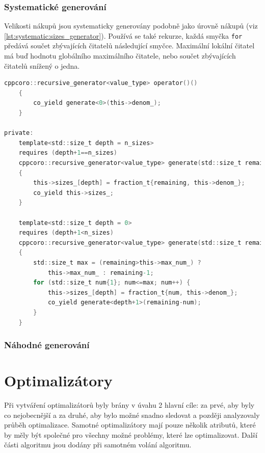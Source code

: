 \subsection{Systematické generování}
Velikosti nákupů jsou systematicky generovány podobně jako úrovně nákupů (viz \ref{lst:systematic:sizes_generator}).
Používá se také rekurze, každá smyčka \texttt{for} předává součet zbývajících čitatelů následující smyčce.
Maximální lokální čitatel má buď hodnotu globálního maximálního čitatele, nebo součet zbývajících čitatelů snížený o jedna.

\begin{lstlisting}[caption={~Metody pro systematické generování velikostí nákupu},label={lst:systematic:sizes_generator},captionpos=t,abovecaptionskip=-\medskipamount,belowcaptionskip=\medskipamount,language=C]
    cppcoro::recursive_generator<value_type> operator()()
    {
        co_yield generate<0>(this->denom_);
    }

private:
    template<std::size_t depth = n_sizes>
    requires (depth+1==n_sizes)
    cppcoro::recursive_generator<value_type> generate(std::size_t remaining)
    {
        this->sizes_[depth] = fraction_t{remaining, this->denom_};
        co_yield this->sizes_;
    }

    template<std::size_t depth = 0>
    requires (depth+1<n_sizes)
    cppcoro::recursive_generator<value_type> generate(std::size_t remaining)
    {
        std::size_t max = (remaining>this->max_num_) ?
            this->max_num_ : remaining-1;
        for (std::size_t num{1}; num<=max; num++) {
            this->sizes_[depth] = fraction_t{num, this->denom_};
            co_yield generate<depth+1>(remaining-num);
        }
    }
\end{lstlisting}

\subsection{Náhodné generování}

\chapter{Optimalizátory}
Při vytváření optimalizátorů byly brány v úvahu 2 hlavní cíle: za prvé, aby byly co nejobecnější a za druhé, aby bylo možné snadno sledovat a později analyzovaly průběh optimalizace.
Samotné optimalizátory mají pouze několik atributů, které by měly být společné pro všechny možné problémy, které lze optimalizovat.
Další části algoritmu jsou dodány při samotném volání algoritmu.

